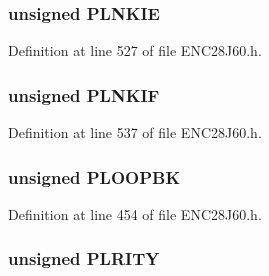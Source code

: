 \hypertarget{union_p_h_y_r_e_g_a27aff31ae8edd86591de84c2cdbdeae6}{}
\subsubsection[{P\+L\+N\+K\+I\+E}]{\setlength{\rightskip}{0pt plus 5cm}unsigned P\+L\+N\+K\+I\+E}\label{union_p_h_y_r_e_g_a27aff31ae8edd86591de84c2cdbdeae6}


Definition at line 527 of file E\+N\+C28\+J60.\+h.

\hypertarget{union_p_h_y_r_e_g_a2ed81f76c127a81e8d099e890ff9a345}{}
\subsubsection[{P\+L\+N\+K\+I\+F}]{\setlength{\rightskip}{0pt plus 5cm}unsigned P\+L\+N\+K\+I\+F}\label{union_p_h_y_r_e_g_a2ed81f76c127a81e8d099e890ff9a345}


Definition at line 537 of file E\+N\+C28\+J60.\+h.

\hypertarget{union_p_h_y_r_e_g_a0ee2cc01c3ca689388540be3f16a614a}{}
\subsubsection[{P\+L\+O\+O\+P\+B\+K}]{\setlength{\rightskip}{0pt plus 5cm}unsigned P\+L\+O\+O\+P\+B\+K}\label{union_p_h_y_r_e_g_a0ee2cc01c3ca689388540be3f16a614a}


Definition at line 454 of file E\+N\+C28\+J60.\+h.

\hypertarget{union_p_h_y_r_e_g_afcc4eb2534dad5882f255cd56d755efb}{}
\subsubsection[{P\+L\+R\+I\+T\+Y}]{\setlength{\rightskip}{0pt plus 5cm}unsigned P\+L\+R\+I\+T\+Y}\label{union_p_h_y_r_e_g_afcc4eb2534dad5882f255cd56d755efb}


